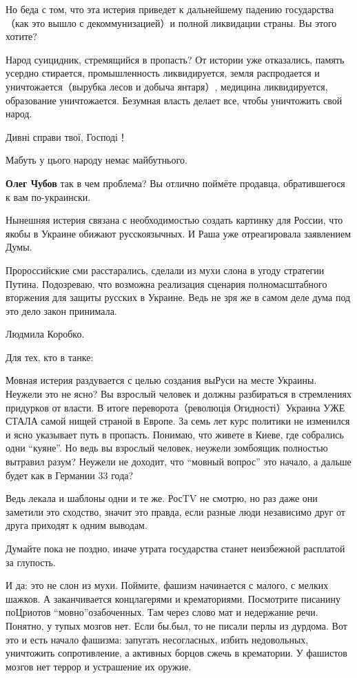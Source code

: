 \begin{itemize}
Но беда с том, что эта истерия приведет к дальнейшему падению государства（как
это вышло с декоммунизацией）и полной ликвидации страны. Вы этого хотите?

Народ суицидник, стремящийся в пропасть? От истории уже отказались, память
усердно стирается, промышленность ликвидируется, земля распродается и
уничтожается（вырубка лесов и добыча янтаря）, медицина ликвидируется,
образование уничтожается. Безумная власть делает все, чтобы уничтожить свой
народ.

Дивні справи твої, Господі！

Мабуть у цього народу немає майбутнього.

\textbf{Олег Чубов} так в чем проблема? Вы отлично поймёте продавца, обратившегося к вам по-украински.

Нынешняя истерия связана с необходимостью создать картинку для России, что
якобы в Украине обижают русскоязычных. И Раша уже отреагировала заявлением
Думы.

Пророссийские сми расстарались, сделали из мухи слона в угоду стратегии Путина.
Подозреваю, что возможна реализация сценария полномасштабного вторжения для
защиты русских в Украине. Ведь не зря же в самом деле дума под это дело закон
принимала.

Людмила Коробко.

Для тех, кто в танке:

Мовная истерия раздувается с целью создания выРуси на месте Украины. Неужели
это не ясно? Вы взрослый человек и должны разбираться в стремлениях придурков
от власти. В итоге переворота（революція Огидності）Украина УЖЕ СТАЛА самой
нищей страной в Европе. За семь лет курс политики не изменился и ясно указывает
путь в пропасть. Понимаю, что живете в Киеве, где собрались одни \enquote{куяне}. Но
ведь вы взрослый человек, неужели зомбоящик полностью вытравил разум? Неужели
не доходит, что \enquote{мовный вопрос} это начало, а дальше будет как в Германии 33
года?

Ведь лекала и шаблоны одни и те же. РосTV не смотрю, но раз даже они заметили
это сходство, значит это правда, если разные люди независимо друг от друга
приходят к одним выводам.

Думайте пока не поздно, иначе утрата государства станет неизбежной расплатой за глупость.

И да: это не слон из мухи. Поймите, фашизм начинается с малого, с мелких
шажков. А заканчивается концлагерями и крематориями. Посмотрите писанину
поЦриотов \enquote{мовно}озабоченных. Там через слово мат и недержание речи. Понятно, у
тупых мозгов нет. Если бы.был, то не писали перлы из дурдома. Вот это и есть
начало фашизма: запугать несогласных, избить недовольных, уничтожить
сопротивление, а активных борцов сжечь в крематории. У фашистов мозгов нет
террор и устрашение их оружие.



\end{itemize}
